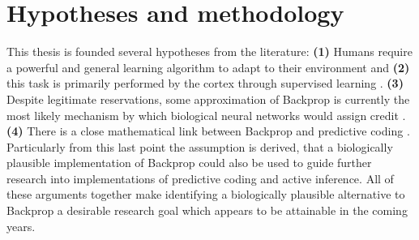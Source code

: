 \section{Hypotheses and methodology}

This thesis is founded several hypotheses from the literature: \textbf{(1)} Humans require a powerful and general
learning algorithm to adapt to their environment \citep{Bartunov2018} and \textbf{(2)} this task is primarily performed
by the cortex through supervised learning \citep{Marblestone2016}. \textbf{(3)} Despite legitimate reservations, some
approximation of Backprop is currently the most likely mechanism by which biological neural networks would assign credit
\citep{whittington2019theories}. \textbf{(4)} There is a close mathematical link between Backprop and predictive coding
\citep{millidge2021predictive}. Particularly from this last point the assumption is derived, that a biologically
plausible implementation of Backprop could also be used to guide further research into implementations of predictive
coding and active inference. All of these arguments together make identifying a biologically plausible alternative to
Backprop a desirable research goal which appears to be attainable in the coming years.


